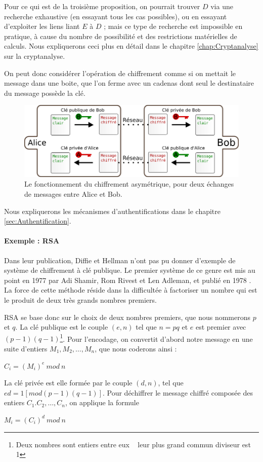 Pour ce qui est de la troisième proposition, on pourrait trouver $D$
via une recherche exhaustive (en essayant tous les cas possibles), ou
en essayant d'exploiter les liens liant $E$ à $D$ ; mais ce type
de recherche est impossible en pratique, à cause du nombre de
possibilité et des restrictions matérielles de calculs. Nous
expliquerons ceci plus en détail dans le chapitre
\ref{chap:Cryptanalyse} sur la cryptanalyse.

On peut donc considérer l'opération de chiffrement comme si on
mettait le message dans une boite, que l'on ferme avec un cadenas
dont seul le destinataire du message possède la clé.

\begin{figure}[h]
  \begin{center}
    \includegraphics[scale=0.5]{images/ChiffrementAsymetrique.png}
  \end{center}
  \caption{Le fonctionnement du chiffrement asymétrique, pour deux
    échanges de messages entre Alice et Bob.}
  \label{fig:ChiffrementSymetrique}
\end{figure}

Nous expliquerons les mécanismes d'authentifications dans le 
chapitre \ref{sec:Authentification}. \\

\paragraph{Exemple : RSA}
Dans leur publication, Diffie et Hellman n'ont pas pu donner
d'exemple de système de chiffrement à clé publique. Le premier
système de ce genre est mis au point en 1977 par Adi Shamir, Rom
Rivest et Len Adleman, et publié en 1978 \cite{RSAPaper}.
La force de cette méthode réside dans la difficultée à factoriser
un nombre qui est le produit de deux très grands nombres premiers. 

RSA se base donc sur le choix de deux nombres premiers, que nous
nommerons $p$ et $q$.
La clé publique est le couple $(e,n)$ tel que $n = p q$ et $e$ est
premier avec $(p-1) (q-1)$\footnote{Deux nombres sont entiers
entre eux \ssi~ leur plus grand commun diviseur est 1}.
Pour l'encodage, on convertit d'abord notre message en une suite
d'entiers $M_1, M_2, \dots, M_n$, %
que nous coderons ainsi :
\begin{center}
  $C_i = (M_i)^e ~mod~n$
\end{center}

La clé privée est elle formée par le couple $(d,n)$, tel que
$e d = 1 [mod (p-1) (q-1)]$.
Pour déchiffrer le message chiffré composée des entiers $C_1. C_2,
\dots, C_n$, on applique la formule
\begin{center}
  $M_i = (C_i)^d ~mod~n$
\end{center}


